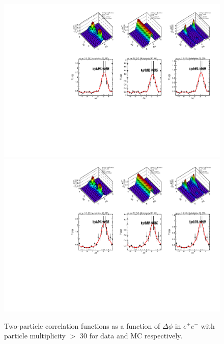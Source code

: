 \begin{figure}[!htb]
\begin{center}
\includegraphics[width=.45\textwidth]{images/BeamAxis/30_999_2/beam/LEP1Data1992_thrust0_mix0_wta0_perp0_gen0_ajrej0_ajrejcut0p0_threejet0_threejetcut0p0_owbarrel0_anatyperegion0_etabarrelcut0p0_typeEnergyBarrelSel0_etabarrelcutforEselection0p0_maxrelenergyinsidebarrel1p0_typemultiplicity0_ASummary_0_30_999_2_0.pdf}
\includegraphics[width=.45\textwidth]{images/BeamAxis/30_999_2/beam/LEP1MC1994_20180323_thrust0_mix0_wta0_perp0_gen0_ajrej0_ajrejcut0p0_threejet0_threejetcut0p0_owbarrel0_anatyperegion0_etabarrelcut0p0_typeEnergyBarrelSel0_etabarrelcutforEselection0p0_maxrelenergyinsidebarrel1p0_typemultiplicity0_ASummary_0_30_999_2_0.pdf}
\caption{Two-particle correlation functions as a function of  $\Delta\phi$ in $e^{+}e^{-}$ with particle multiplicity $>$ 30 for data and MC respectively.}
\label{fig:ProjectionMultBigger30} 
\end{center}
\end{figure}
